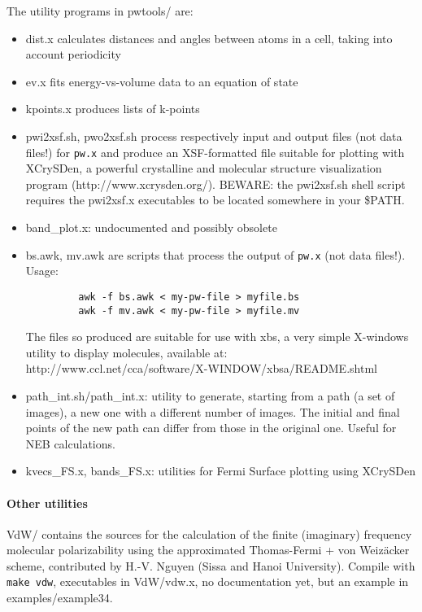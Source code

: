 \documentclass[12pt,a4paper]{article}
\def\pw.x{\texttt{pw.x}}
\begin{document}
The utility programs in pwtools/ are:
\begin{itemize}
\item dist.x calculates distances and angles between atoms in a cell,
  taking into account periodicity 
\item ev.x fits energy-vs-volume data to an equation of state
\item kpoints.x produces lists of k-points
\item pwi2xsf.sh, pwo2xsf.sh process respectively input and output
  files (not data files!) for \pw.x and produce an XSF-formatted file
  suitable for plotting with XCrySDen, a powerful crystalline and
  molecular structure visualization program
  (http://www.xcrysden.org/). BEWARE: the pwi2xsf.sh shell script
  requires the pwi2xsf.x executables to be located somewhere in your
  \$PATH. 
\item band\_plot.x: undocumented and possibly obsolete 
\item bs.awk, mv.awk are scripts that process the output of \pw.x (not
data files!). Usage: 
\begin{verbatim}
         awk -f bs.awk < my-pw-file > myfile.bs
         awk -f mv.awk < my-pw-file > myfile.mv
\end{verbatim}
The files so produced are suitable for use with xbs, a very simple
X-windows utility to display molecules, available at:\\
http://www.ccl.net/cca/software/X-WINDOW/xbsa/README.shtml 
\item path\_int.sh/path\_int.x: utility to generate, starting from a
  path (a set of images), a new one with a different number of
  images. The initial and final points of the new path can differ from
  those in the original one. Useful for NEB calculations. 
\item kvecs\_FS.x, bands\_FS.x: utilities for Fermi Surface plotting
  using XCrySDen
\end{itemize}

\paragraph{Other utilities}
VdW/ contains the sources for the calculation of the finite (imaginary)
frequency molecular polarizability using the approximated Thomas-Fermi
+ von Weiz\"acker scheme, contributed by H.-V. Nguyen (Sissa and
Hanoi University). Compile with \texttt{make vdw}, executables in VdW/vdw.x, no
documentation yet, but an example in examples/example34.  
\end{document}

